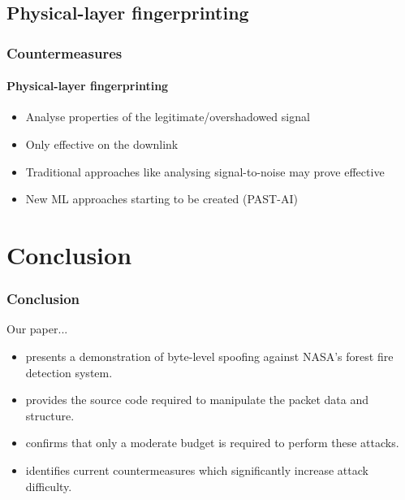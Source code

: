 \documentclass{beamer}
\begin{document}
\subsection{Physical-layer fingerprinting}
\begin{frame}
  \frametitle{Countermeasures}
  \framesubtitle{Physical-layer fingerprinting}

  \begin{itemize}
    \item Analyse properties of the legitimate/overshadowed signal
    \item Only effective on the downlink
    \item Traditional approaches like analysing signal-to-noise may prove effective
    \item New ML approaches starting to be created (PAST-AI)
  \end{itemize}
\end{frame}

\section{Conclusion}

\begin{frame}
  \frametitle{Conclusion}

  Our paper...
  \begin{itemize}
    \item presents a demonstration of byte-level spoofing against NASA's forest fire detection system.
    \item provides the source code required to manipulate the packet data and structure.
    \item confirms that only a moderate budget is required to perform these attacks.
    \item identifies current countermeasures which significantly increase attack difficulty.
  \end{itemize}
\end{frame}

\end{document}
